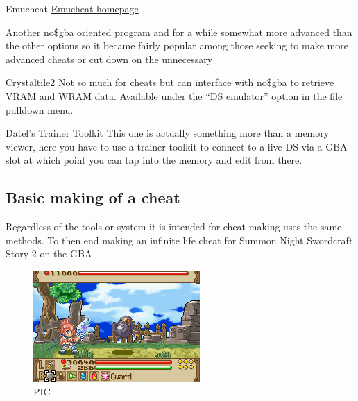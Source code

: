 \documentclass[
]{book}
\begin{document}
Emucheat \href{http://www.emucheat.com/}{Emucheat homepage}

Another no\$gba oriented program and for a while somewhat more advanced than the other options so it became fairly popular among those seeking to make more advanced cheats or cut down on the unnecessary

Crystaltile2 Not so much for cheats but can interface with no\$gba to retrieve VRAM and WRAM data. Available under the ``DS emulator'' option in the file pulldown menu.

Datel's Trainer Toolkit This one is actually something more than a memory viewer, here you have to use a trainer toolkit to connect to a live DS via a GBA slot at which point you can tap into the memory and edit from there.

\hypertarget{basic-making-of-a-cheat}{%
\subsection{Basic making of a cheat}\label{basic-making-of-a-cheat}}

Regardless of the tools or system it is intended for cheat making uses the same methods. To then end making an infinite life cheat for Summon Night Swordcraft Story 2 on the GBA

\begin{figure}
\centering
\includegraphics{images/201_home_fast6191_romhackingguide_unrenamed_fil___ginal_borders_romhackingguidecheatexample_1.png}
\caption{PIC}
\end{figure}
\end{document}
